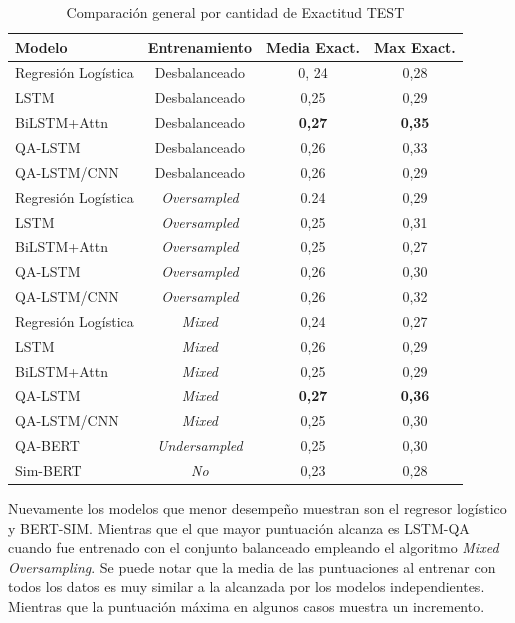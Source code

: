 \begin{table}[!tb]
  \begin{center}
    \caption{Comparación general por cantidad de Exactitud TEST}
    \begin{tabular}{l|c|c|c}
      \textbf{Modelo} & \textbf{Entrenamiento} & \textbf{Media Exact.} & \textbf{Max Exact.}\\
      \hline
      Regresión Logística & Desbalanceado & 0, 24 & 0,28\\
      LSTM & Desbalanceado & 0,25 & 0,29 \\
      BiLSTM+Attn & Desbalanceado & \textbf{0,27} & \textbf{0,35} \\
      QA-LSTM & Desbalanceado & 0,26 & 0,33 \\
      QA-LSTM/CNN & Desbalanceado & 0,26 & 0,29 \\

      Regresión Logística & \textit{Oversampled} & 0.24 & 0,29 \\
      LSTM & \textit{Oversampled} & 0,25 & 0,31 \\
      BiLSTM+Attn & \textit{Oversampled} & 0,25 & 0,27 \\
      QA-LSTM & \textit{Oversampled} & 0,26 & 0,30 \\
      QA-LSTM/CNN & \textit{Oversampled} & 0,26 & 0,32 \\

      Regresión Logística & \textit{Mixed} & 0,24 & 0,27 \\
      LSTM & \textit{Mixed} & 0,26 & 0,29 \\
      BiLSTM+Attn & \textit{Mixed} & 0,25 & 0,29 \\
      QA-LSTM & \textit{Mixed} & \textbf{0,27} & \textbf{0,36} \\
      QA-LSTM/CNN & \textit{Mixed} & 0,25 & 0,30 \\

      QA-BERT & \textit{Undersampled} & 0,25 & 0,30 \\
      Sim-BERT & \textit{No} & 0,23 & 0,28 \\
      
    \end{tabular}
  \end{center}
  \label{comparison_acc_general}
\end{table}

Nuevamente los modelos que menor desempeño muestran son el regresor logístico y BERT-SIM. Mientras que el que mayor puntuación alcanza es LSTM-QA cuando fue entrenado con el conjunto balanceado empleando el algoritmo \textit{Mixed Oversampling}. Se puede notar que la media de las puntuaciones al entrenar con todos los datos es muy similar a la alcanzada por los modelos independientes. Mientras que la puntuación máxima en algunos casos muestra un incremento.

